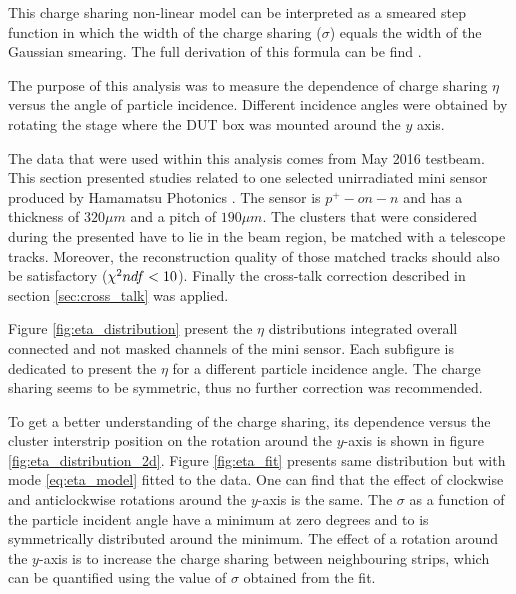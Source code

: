 This charge sharing non-linear model can be interpreted as a smeared step function in which the width of the charge sharing ($ \sigma $) equals the width of the Gaussian smearing.   The full derivation of this formula can be find \cite{eta_note}. 

The purpose of this analysis was to measure the dependence of charge sharing $ \eta $ versus the angle of particle incidence.  Different incidence angles were obtained by rotating the stage where the DUT box was mounted around the $y$ axis. 

The data that were used within this analysis comes from May 2016 testbeam.  This section presented studies related to one selected unirradiated mini sensor produced by Hamamatsu Photonics \cite{Hamamatsu}. The sensor is $p^{+}-on-n$ and has a thickness of $320 \mu m$ and a pitch of $190 \mu m$. The clusters that were considered during the presented have to lie in the beam region, be matched with a telescope tracks.  Moreover, the reconstruction quality of those matched tracks should also be satisfactory ($\chi^{2}\/ndf<10$).
Finally the cross-talk correction described in section \ref{sec:cross_talk} was applied.

Figure \ref{fig:eta_distribution} present the $\eta$ distributions integrated overall connected and not masked channels of the mini sensor. Each subfigure is dedicated to present the  $\eta$ for a different particle incidence angle. 
The charge sharing seems to be symmetric, thus no further correction was recommended. 

To get a better understanding of the charge sharing, its dependence versus the cluster interstrip position on the rotation around the $y$-axis is shown in figure \ref{fig:eta_distribution_2d}. Figure \ref{fig:eta_fit} presents same distribution but with mode \ref{eq:eta_model} fitted to the data. One can find that the effect of clockwise and anticlockwise rotations around the $y$-axis is the same.  The $\sigma$ as a function
of the particle incident angle have a minimum at zero degrees and to is symmetrically distributed around the minimum. The effect of a rotation around the $y$-axis is to increase the charge sharing between neighbouring strips, which can be quantified using the value of $\sigma$ obtained from the fit. 


